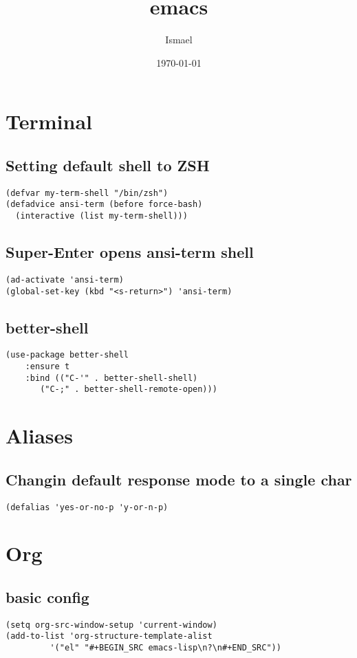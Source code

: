 \documentclass[11pt]{article}
\author{Ismael}
\date{\today}
\title{emacs}
\begin{document}
\maketitle
\tableofcontents

\section{Terminal}
\label{sec-1}
\subsection{Setting default shell to ZSH}
\label{sec-1-1}
\begin{verbatim}
(defvar my-term-shell "/bin/zsh")
(defadvice ansi-term (before force-bash)
  (interactive (list my-term-shell)))
\end{verbatim}
\subsection{Super-Enter opens ansi-term shell}
\label{sec-1-2}
\begin{verbatim}
(ad-activate 'ansi-term)
(global-set-key (kbd "<s-return>") 'ansi-term)
\end{verbatim}
\subsection{better-shell}
\label{sec-1-3}
\begin{verbatim}
(use-package better-shell
    :ensure t
    :bind (("C-'" . better-shell-shell)
	   ("C-;" . better-shell-remote-open)))
\end{verbatim}
\section{Aliases}
\label{sec-2}
\subsection{Changin default response mode to a single char}
\label{sec-2-1}
\begin{verbatim}
(defalias 'yes-or-no-p 'y-or-n-p)
\end{verbatim}

\section{Org}
\label{sec-3}
\subsection{basic config}
\label{sec-3-1}
\begin{verbatim}
(setq org-src-window-setup 'current-window)
(add-to-list 'org-structure-template-alist
	     '("el" "#+BEGIN_SRC emacs-lisp\n?\n#+END_SRC"))
\end{verbatim}
\end{document}
